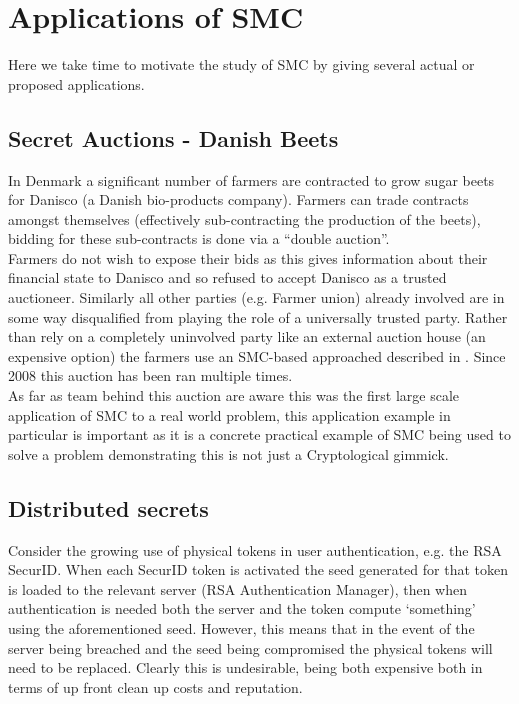 \documentclass[ %
                    author={Nicholas Tutte},
                supervisor={Prof. Nigel Smart},
                    degree={MEng},
                     title={Secure Two Party Computation},
                  subtitle={A practical comparison of recent protocols},
                      type={Research - GG1K},
                      year={2015} ]{dissertation}
\begin{document}
		\section{Applications of SMC} \label{sub:Applications}
			Here we take time to motivate the study of SMC by giving several actual or proposed applications.

			\subsection{Secret Auctions - Danish Beets} \label{BeetsAuctionApplication}
				In Denmark a significant number of farmers are contracted to grow sugar beets for Danisco (a Danish bio-products company). Farmers can trade contracts amongst themselves (effectively sub-contracting the production of the beets), bidding for these sub-contracts is done via a ``double auction''.\\

				Farmers do not wish to expose their bids as this gives information about their financial state to Danisco and so refused to accept Danisco as a trusted auctioneer. Similarly all other parties (e.g. Farmer union) already involved are in some way disqualified from playing the role of a universally trusted party. Rather than rely on a completely uninvolved party like an external auction house (an expensive option) the farmers use an SMC-based approached described in \cite{SugarBeets}. Since 2008 this auction has been ran multiple times.\\

				As far as team behind this auction are aware this was the first large scale application of SMC to a real world problem, this application example in particular is important as it is a concrete practical example of SMC being used to solve a problem demonstrating this is not just a Cryptological gimmick.

			\subsection{Distributed secrets} \label{sub2:DistributedSecretApplication}
				Consider the growing use of physical tokens in user authentication, e.g. the RSA SecurID. When each SecurID token is activated the seed generated for that token is loaded to the relevant server (RSA Authentication Manager), then when authentication is needed both the server and the token compute `something' using the aforementioned seed. However, this means that in the event of the server being breached and the seed being compromised the physical tokens will need to be replaced. Clearly this is undesirable, being both expensive both in terms of up front clean up costs and reputation.\\
\end{document}
